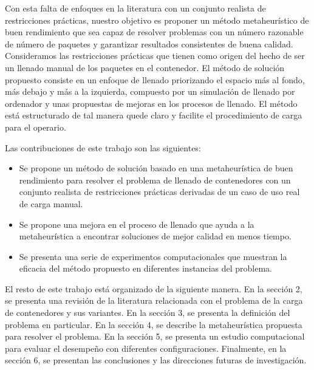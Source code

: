 Con esta falta de enfoques en la literatura con un conjunto realista de restricciones prácticas, nuestro objetivo es proponer un método metaheurístico de buen rendimiento que sea capaz de resolver problemas con un número razonable de número de paquetes y garantizar resultados consistentes de buena calidad. Consideramos las restricciones prácticas que tienen como origen del hecho de ser un llenado manual de los paquetes en el contenedor. El método de solución propuesto consiste en un enfoque de llenado priorizando el espacio más al fondo, más debajo y más a la izquierda, compuesto por un simulación de llenado por ordenador y unas propuestas de mejoras en los procesos de llenado. El método está estructurado de tal manera quede claro y facilite el procedimiento de carga para el operario.

Las contribuciones de este trabajo son las siguientes:

\begin{itemize}
    \item Se propone un método de solución basado en una metaheurística de buen rendimiento para resolver el problema de llenado de contenedores con un conjunto realista de restricciones prácticas derivadas de un caso de uso real de carga manual.
    \item Se propone una mejora en el proceso de llenado que ayuda a la metaheurística a encontrar soluciones de mejor calidad en menos tiempo.
    \item Se presenta una serie de experimentos computacionales que muestran la eficacia del método propuesto en diferentes instancias del problema.
\end{itemize}

El resto de este trabajo está organizado de la siguiente manera. En la sección 2, se presenta una revisión de la literatura relacionada con el problema de la carga de contenedores y sus variantes. En la sección 3, se presenta la definición del problema en particular. En la sección 4, se describe la metaheurística propuesta para resolver el problema. En la sección 5, se presenta un estudio computacional para evaluar el desempeño con diferentes configuraciones. Finalmente, en la sección 6, se presentan las conclusiones y las direcciones futuras de investigación.